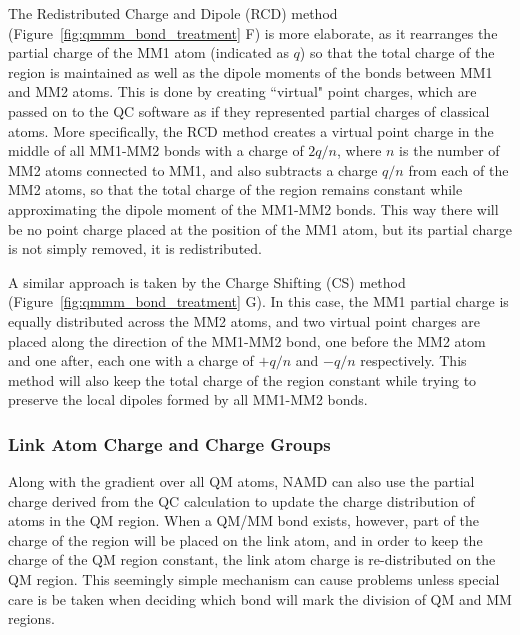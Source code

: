 The Redistributed Charge and Dipole (RCD) method
(Figure~\ref{fig:qmmm_bond_treatment} F)
is more elaborate, as it rearranges the partial charge of the 
MM1 atom (indicated as $q$) so that the total charge of the region 
is maintained as well as the dipole moments of the bonds between 
MM1 and MM2 atoms. This is done by creating ``virtual" point charges, 
which are passed on to the QC software as if they represented 
partial charges of classical atoms. More specifically, the RCD method 
creates a virtual point charge in the middle of all MM1-MM2 bonds 
with a charge of $2q/n$, where $n$ is the number of 
MM2 atoms connected to MM1, and also subtracts a charge $q/n$ 
from each of the MM2 atoms, so that the total charge of the region 
remains constant while approximating the dipole moment of the 
MM1-MM2 bonds. This way there will be no point charge placed at the 
position of the MM1 atom, but its partial charge is not simply removed, 
it is redistributed.

A similar approach is taken by the Charge Shifting (CS) method 
(Figure~\ref{fig:qmmm_bond_treatment} G).
In this case, the MM1 partial charge is equally 
distributed across the MM2 atoms, and two virtual point charges 
are placed along the direction of the MM1-MM2 bond, one before 
the MM2 atom and one after, each one with a charge of $+q/n$ 
and $-q/n$ respectively. This method will also keep the 
total charge of the region constant while trying to preserve 
the local dipoles formed by all MM1-MM2 bonds.


\subsubsection{Link Atom Charge and Charge Groups}

Along with the gradient over all QM atoms, NAMD can also use 
the partial charge derived from the QC calculation to update 
the charge distribution of atoms in the QM region. 
When a QM/MM bond exists, however, part of the charge of the 
region will be placed on the link atom, and in order to keep the 
charge of the QM region constant, the link atom charge is 
re-distributed on the QM region. This seemingly simple mechanism 
can cause problems unless special care is be taken when deciding 
which bond will mark the division of QM and MM regions.

